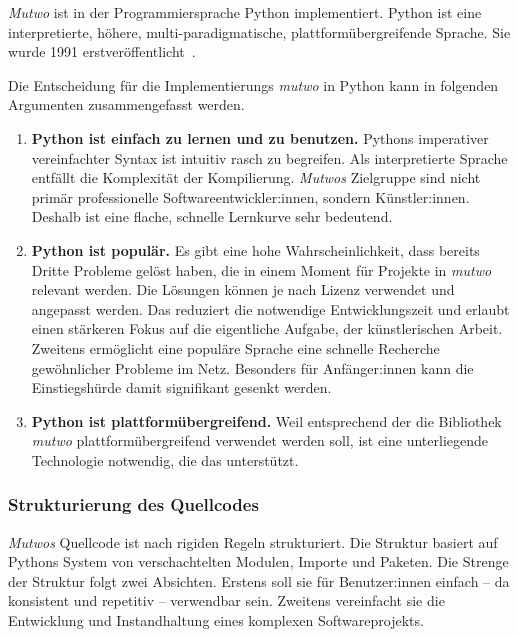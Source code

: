 \documentclass[12pt,a4paper,ngerman]{article}
\begin{document}
\emph{Mutwo} ist in der Programmiersprache Python implementiert.
Python ist eine interpretierte, höhere, multi-paradigmatische, plattformübergreifende Sprache.
Sie wurde 1991 erstveröffentlicht~\parencite{generalPythonFAQ}.

\smallskip

Die Entscheidung für die Implementierungs \emph{mutwo} in Python kann in folgenden Argumenten zusammengefasst werden.


\begin{enumerate}
    \item{
            \textbf{Python ist einfach zu lernen und zu benutzen.}
            Pythons imperativer vereinfachter Syntax ist intuitiv rasch zu begreifen.
            Als interpretierte Sprache entfällt die Komplexität der Kompilierung.
            \emph{Mutwos} Zielgruppe sind nicht primär  professionelle Softwareentwickler:innen, sondern Künstler:innen.
            Deshalb ist eine flache, schnelle Lernkurve sehr bedeutend.
    }
    \item{
            \textbf{Python ist populär.}
            Es gibt eine hohe Wahrscheinlichkeit, dass bereits Dritte Probleme gelöst haben, die in einem Moment für Projekte in \emph{mutwo} relevant werden.
            Die Lösungen können je nach Lizenz verwendet und angepasst werden.
            Das reduziert die notwendige Entwicklungszeit und erlaubt einen stärkeren Fokus auf die eigentliche Aufgabe, der künstlerischen Arbeit.
            Zweitens ermöglicht eine populäre Sprache eine schnelle Recherche gewöhnlicher Probleme im Netz.
            Besonders für Anfänger:innen kann die Einstiegshürde damit signifikant gesenkt werden.
    }
    \item{
            \textbf{Python ist plattformübergreifend.}
            Weil entsprechend der \emph{} die Bibliothek \emph{mutwo} plattformübergreifend verwendet werden soll, ist eine unterliegende Technologie notwendig, die das unterstützt.
    }
\end{enumerate}


\subsubsection{Strukturierung des Quellcodes}
\label{quellcodeStruktur}

\emph{Mutwos} Quellcode ist nach rigiden Regeln strukturiert.
Die Struktur basiert auf Pythons System von verschachtelten Modulen, Importe und Paketen.
Die Strenge der Struktur folgt zwei Absichten.
Erstens soll sie für Benutzer:innen einfach -- da konsistent und repetitiv -- verwendbar sein.
Zweitens vereinfacht sie die Entwicklung und Instandhaltung eines komplexen Softwareprojekts.
\end{document}
